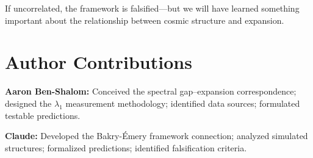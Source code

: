 \documentclass[11pt,a4paper]{article}
\theoremstyle{plain}
\theoremstyle{definition}
\theoremstyle{remark}
\begin{document}
If uncorrelated, the framework is falsified---but we will have learned something important about the relationship between cosmic structure and expansion.


\section*{Author Contributions}

\textbf{Aaron Ben-Shalom:} Conceived the spectral gap--expansion correspondence; designed the $\lambda_1$ measurement methodology; identified data sources; formulated testable predictions.

\textbf{Claude:} Developed the Bakry-\'{E}mery framework connection; analyzed simulated structures; formalized predictions; identified falsification criteria.

\end{document}
